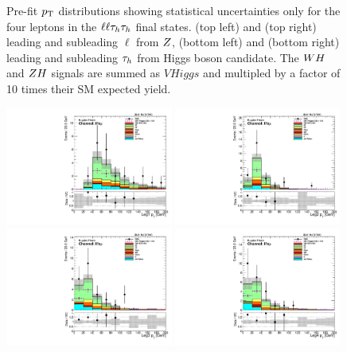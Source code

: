 \begin{figure}[htbp]
     \caption{
Pre-fit $p_\mathrm{T}$ distributions showing statistical uncertainties only for the 
four leptons in the $\ell\ell\tau_{h}\tau_{h}$ final states.
(top left) and (top right) leading and subleading $\ell$ from $Z$,
(bottom left) and (bottom right) leading and subleading $\tau_{h}$ from Higgs boson candidate.
The $WH$ and $ZH$ signals are summed as $VHiggs$ and multipled by a factor of
10 times their SM expected yield.
     }
     \label{fig:lltt_pts}
\end{figure}

\begin{figure}[htbp]
\centering
     \includegraphics[width=0.49\textwidth]{higgs_to_taus_vh/plots/zh/fr_OS_control/LLEM/pt_1.pdf}
     \includegraphics[width=0.49\textwidth]{higgs_to_taus_vh/plots/zh/fr_OS_control/LLEM/pt_2.pdf}
     \includegraphics[width=0.49\textwidth]{higgs_to_taus_vh/plots/zh/fr_OS_control/LLEM/pt_3.pdf}
     \includegraphics[width=0.49\textwidth]{higgs_to_taus_vh/plots/zh/fr_OS_control/LLEM/pt_4.pdf}

\end{figure}
